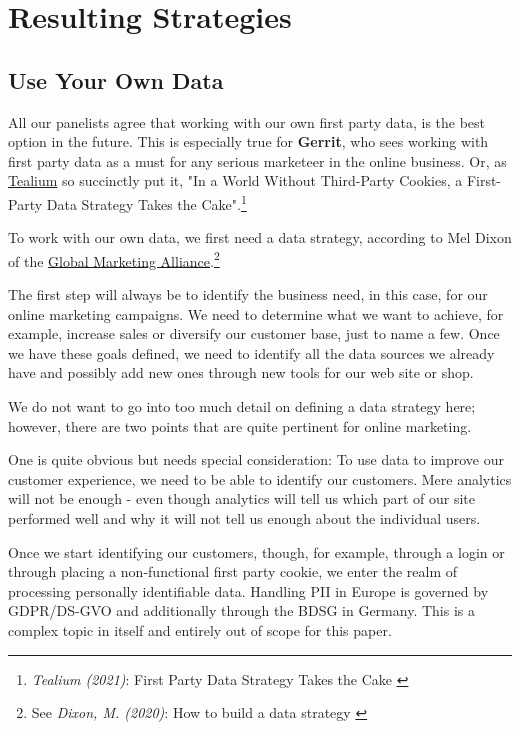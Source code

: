 %
%

\pagebreak
\section{Resulting Strategies}

\onehalfspacing

\subsection{Use Your Own Data}

All our panelists agree that working with our own first party data, is the best option in the future. This is especially true for \textbf{Gerrit}, who sees working with first party data as a must for any serious marketeer in the online business. Or, as \href{https://tealium.com/}{Tealium} so succinctly put it, "In a World Without Third-Party Cookies, a First-Party Data Strategy Takes the Cake".\footnote{\textit{Tealium (2021)}: First Party Data Strategy Takes the Cake \cite{firstCake}}

To work with our own data, we first need a data strategy, according to Mel Dixon of the \href{https://www.the-gma.com/}{Global Marketing Alliance}.\footnote{See \textit{Dixon, M. (2020)}: How to build a data strategy \cite{dataStrategy}}

The first step will always be to identify the business need, in this case, for our online marketing campaigns. We need to determine what we want to achieve, for example, increase sales or diversify our customer base, just to name a few. Once we have these goals defined, we need to identify all the data sources we already have and possibly add new ones through new tools for our web site or shop.

We do not want to go into too much detail on defining a data strategy here; however, there are two points that are quite pertinent for online marketing.

One is quite obvious but needs special consideration: To use data to improve our customer experience, we need to be able to identify our customers. Mere analytics will not be enough - even though analytics will tell us which part of our site performed well and why it will not tell us enough about the individual users.

Once we start identifying our customers, though, for example, through a login or through placing a non-functional first party cookie, we enter the realm of processing personally identifiable data. Handling PII in Europe is governed by GDPR/DS-GVO and additionally through the BDSG in Germany. This is a complex topic in itself and entirely out of scope for this paper.

